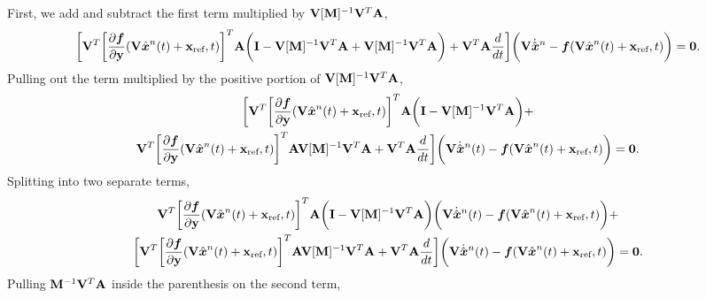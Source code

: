 \documentclass[3p,computermodern,10pt]{elsarticle}
\begin{document}
\begin{appendices}
First, we add and subtract the first term multiplied by $\basisspace [\massArgnt{n}]^{-1}\basisspace^T \stweightingMat$, 
$$
 \bigg[\basisspace^T \bigg[\frac{\partial \velocity}{\partial \stateyDiscrete}(\veloargsromn) \bigg]^T \stweightingMatArg{n} \bigg( \mathbf{I} - \basisspace [\massArgnt{n}]^{-1} \basisspace^T\stweightingMatArg{n} + \basisspace [\massArgnt{n}]^{-1} \basisspace^T \stweightingMatArg{n} \bigg)  + \basisspace^T \stweightingMatArg{n}  \frac{d}{dt} \bigg] \bigg(  \basisspace \dot{\genstate}^n   -  \velocity(\veloargsromn) \bigg) = \bz.
$$
Pulling out the term multiplied by the positive portion of $\basisspace [\massArgnt{n}]^{-1} \basisspace^T \stweightingMatArg{n}$,
\begin{multline*} 
\bigg[\basisspace^T \bigg[\frac{\partial \velocity}{\partial \stateyDiscrete} ( \veloargsromn) \bigg]^T \stweightingMatArg{n}\bigg( \mathbf{I} - \basisspace [\massArgnt{n}]^{-1}  \basisspace^T  \stweightingMatArg{n} \bigg)  + \\ \basisspace^T \bigg[\frac{\partial \velocity}{\partial \stateyDiscrete} (\veloargsromn) \bigg]^T \stweightingMatArg{n} \basisspace [\massArgnt{n}]^{-1}  \basisspace^T \stweightingMatArg{n} +   \basisspace^T \stweightingMatArg{n} \frac{d}{dt} \bigg] \bigg(  \basisspace \genstateDotArg{n}{t}   -  \velocity(\veloargsromn) \bigg) = \bz.
\end{multline*}
Splitting into two separate terms, 
\begin{multline*}
\basisspace^T \bigg[\frac{\partial \velocity}{\partial \stateyDiscrete}(\veloargsromn) \bigg]^T \stweightingMatArg{n}\bigg( \mathbf{I} - \basisspace [\massArgnt{n}]^{-1}  \basisspace^T \stweightingMatArg{n} \bigg)  \bigg(  \basisspace \genstateDotArg{n}{t}   -  \velocity(\veloargsromn) \bigg)  + \\  
\bigg[ \basisspace^T \bigg[\frac{\partial \velocity}{\partial \stateyDiscrete}(\veloargsromn) \bigg]^T \stweightingMatArg{n} \basisspace [\massArgnt{n}]^{-1} \basisspace^T \stweightingMatArg{n} +   \basisspace^T \stweightingMatArg{n} \frac{d}{dt} \bigg] \bigg(  \basisspace \genstateDotArg{n}{t}  -  \velocity(\veloargsromn) \bigg) = \bz.
\end{multline*}
Pulling $\mass^{-1} \basisspace^T \stweightingMatArg{n}$ inside the parenthesis on the second term,

\end{appendices}
\end{document}
